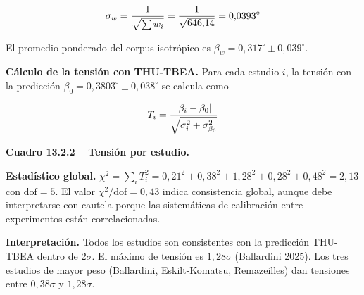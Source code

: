 ﻿\documentclass[11pt,letterpaper]{article}
\begin{document}
\begin{equation*}
  \resizebox{\ifdim\width>\linewidth \linewidth\else\width\fi}{!}{$\displaystyle \sigma_w = \frac{1}{\sqrt{\sum w_i}} = \frac{1}{\sqrt{646{,}14}} = 0{,}0393^\circ$}
\end{equation*}

El promedio ponderado del corpus isotrópico es $\beta_w = 0{,}317^\circ \pm 0{,}039^\circ$.

\textbf{Cálculo de la tensión con THU-TBEA.} Para cada estudio $i$, la tensión con la predicción $\beta_0 = 0{,}3803^\circ \pm 0{,}038^\circ$ se calcula como

\begin{equation*}
  \resizebox{\ifdim\width>\linewidth \linewidth\else\width\fi}{!}{$\displaystyle T_i = \frac{|\beta_i - \beta_0|}{\sqrt{\sigma_i^2 + \sigma_{\beta_0}^2}}$}
\end{equation*}

\textbf{Cuadro 13.2.2 -- Tensión por estudio.}

\begin{table}[htbp]
  \centering
  \small
  \caption{Tensión con THU-TBEA por estudio isotrópico.}
  \label{tab:tension-iso}
\end{table}

\textbf{Estadístico global.} $\chi^2 = \sum_i T_i^2 = 0{,}21^2 + 0{,}38^2 + 1{,}28^2 + 0{,}28^2 + 0{,}48^2 = 2{,}13$ con $\mathrm{dof} = 5$. El valor $\chi^2/\mathrm{dof} = 0{,}43$ indica consistencia global, aunque debe interpretarse con cautela porque las sistemáticas de calibración entre experimentos están correlacionadas.

\textbf{Interpretación.} Todos los estudios son consistentes con la predicción THU-TBEA dentro de $2\sigma$. El máximo de tensión es $1{,}28\sigma$ (Ballardini 2025). Los tres estudios de mayor peso (Ballardini, Eskilt-Komatsu, Remazeilles) dan tensiones entre $0{,}38\sigma$ y $1{,}28\sigma$.
\end{document}
